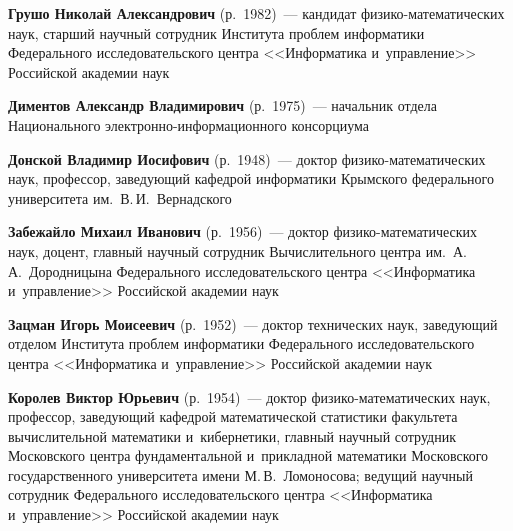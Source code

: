 \begin{multicols}{2}
 
 \noindent
\textbf{Грушо Николай Александрович} (р.\ 1982)~--- 
кандидат фи\-зи\-ко-ма\-те\-ма\-ти\-че\-ских наук, старший научный 
сотрудник Института проб\-лем информатики Федерального исследовательского 
центра <<Информатика и~управ\-ле\-ние>> Российской академии наук
 
  
  \noindent
\textbf{Диментов Александр Владимирович} (р.\ 1975)~--- 
начальник отдела Национального элект\-рон\-но-ин\-фор\-ма\-ци\-он\-но\-го консорциума
 
  \vspace*{4pt}
  
  \noindent
\textbf{Донской Владимир Иосифович} (р.\ 1948)~--- 
доктор фи\-зи\-ко-ма\-те\-ма\-ти\-че\-ских наук, профессор, 
заведующий кафедрой информатики Крымского федерального университета 
им.\ В.\,И.~Вернадского

 \vspace*{4pt}
 
 \noindent
\textbf{Забежайло Михаил Иванович} (р.\ 1956)~--- 
доктор фи\-зи\-ко-ма\-те\-ма\-ти\-че\-ских наук, доцент, главный научный 
сотрудник Вычислительного центра им.\ А.\,А.~Дородницына 
Федерального исследовательского центра <<Информатика и~управ\-ле\-ние>>
Российской академии наук

 \vspace*{4pt}
 
 \noindent
\textbf{Зацман Игорь Моисеевич} (р.\ 1952)~--- доктор тех\-нических наук, 
заведующий отделом Института проб\-лем информатики 
Федерального исследовательского центра <<Информатика и~управ\-ле\-ние>>
Российской академии наук

 \vspace*{4pt}
 
\noindent
\textbf{Королев Виктор Юрьевич} (р.\ 1954)~--- 
доктор фи\-зи\-ко-ма\-те\-ма\-ти\-че\-ских наук, профессор, 
за\-ве\-ду\-ющий кафедрой математической статистики факультета вычислительной 
математики и~кибернетики, главный научный сотрудник 
Московского цент\-ра фундаментальной 
и~прикладной математики Мос\-ков\-ско\-го государственного университета имени 
М.\,В.~Ломоносова; ведущий научный сотрудник Федерального 
исследовательского центра <<Информатика и~управ\-ле\-ние>> 
Российской академии наук

 \vspace*{4pt}
 

\end{multicols}
